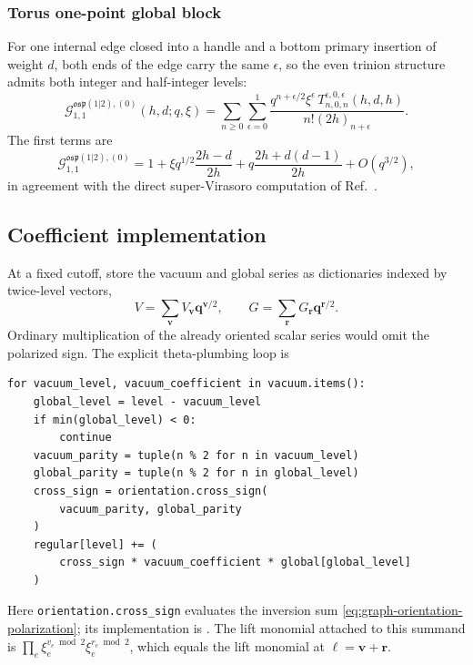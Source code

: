 \documentclass[11pt]{article}
\newcommand{\osp}{\mathfrak{osp}(1|2)}
\newcommand{\G}{\mathcal G}
\begin{document}
\subsubsection{Torus one-point global block}

For one internal edge closed into a handle and a bottom primary insertion of
weight \(d\), both ends of the edge carry the same \(\epsilon\), so the
even trinion structure admits both integer and half-integer levels:
\begin{equation}
 \G_{1,1}^{\osp,(0)}(h,d;q,\xi)
 =\sum_{n\ge0}\sum_{\epsilon=0}^{1}
 \frac{q^{n+\epsilon/2}\xi^\epsilon\,
 T_{n,0,n}^{\epsilon,0,\epsilon}(h,d,h)}
 {n!(2h)_{n+\epsilon}}.
 \label{eq:torus-global}
\end{equation}
The first terms are
\begin{equation}
 \G_{1,1}^{\osp,(0)}
 =1+\xi q^{1/2}\frac{2h-d}{2h}
   +q\frac{2h+d(d-1)}{2h}+O(q^{3/2}),
 \label{eq:torus-global-first-terms}
\end{equation}
in agreement with the direct super-Virasoro computation of
Ref.~\cite{BelavinGeiko2018CRecursion}.


\subsection{Coefficient implementation}
\label{sec:computational-graded-factorization}

At a fixed cutoff, store the vacuum and global series as dictionaries
indexed by twice-level vectors,
\begin{equation}
 V=\sum_{\bm v}V_{\bm v}\bm q^{\bm v/2},
 \qquad
 G=\sum_{\bm r}G_{\bm r}\bm q^{\bm r/2}.
 \label{eq:series-dictionaries}
\end{equation}
Ordinary multiplication of the already oriented scalar series would omit the
polarized sign.  The explicit theta-plumbing loop is
\begin{verbatim}
for vacuum_level, vacuum_coefficient in vacuum.items():
    global_level = level - vacuum_level
    if min(global_level) < 0:
        continue
    vacuum_parity = tuple(n % 2 for n in vacuum_level)
    global_parity = tuple(n % 2 for n in global_level)
    cross_sign = orientation.cross_sign(
        vacuum_parity, global_parity
    )
    regular[level] += (
        cross_sign * vacuum_coefficient * global[global_level]
    )
\end{verbatim}
Here \verb|orientation.cross_sign| evaluates the inversion sum
\eqref{eq:graph-orientation-polarization}; its implementation is
.
The lift monomial attached to this summand is
\(\prod_e\xi_e^{v_e\bmod2}\xi_e^{r_e\bmod2}\), which equals the lift
monomial at \(\bm\ell=\bm v+\bm r\).
\end{document}
